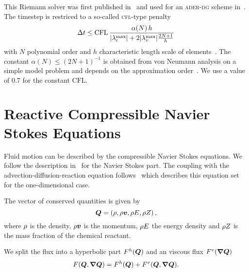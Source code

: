 This Riemann solver was first published in~\cite{gassner2008discontinuous} and used for an \textsc{ader-dg} scheme in~\cite{dumbser2010arbitrary}.
The timestep is restriced to a so-called \textsc{cfl}-type penalty
\begin{equation}
 \Delta t \leq  \text{CFL} \, \frac{\alpha(N) \, h}{\maxConvEigen + 2 \maxViscEigen \frac{2N+1}{h}}
\end{equation}
with $N$ polynomial order and $h$ characteristic length scale of elements~\cite{dumbser2010arbitrary,gassner2008discontinuous}.
The constant $\alpha(N) \leq {\left( 2N+1  \right)}^{-1}$ is obtained from von Neumann analysis on a simple model problem and depends on the approximation order~\cite{dumbser2008unified}.
We use a value of $0.7$ for the constant $\text{CFL}$.


\section{Reactive Compressible Navier Stokes Equations}
Fluid motion can be described by the compressible Navier Stokes equations.
We follow the description in~\cite{dumbser2010arbitrary} for the Navier Stokes part.
The coupling with the advection-diffusion-reaction equation follows~\cite{hidalgo2011ader} which describes this equation set for the one-dimensional case.

The vector of conserved quantities is given by
\begin{equation}
  \label{eq:conserved-variables}
 \bm{Q} = \left( \rho, \rho \bm{v}, \rho E, \rho Z \right),
\end{equation}
where $\rho$ is the density, $\rho \bm{v}$ is the momentum, $\rho E$ the energy density and $\rho Z$ is the mass fraction of the chemical reactant.

We split the flux into a hyperbolic part $F^{h}(\bm{Q})$ and an viscous flux $\viscFlux(\gradQ)$
\begin{equation}
  \label{eq:flux}
  \flux(\Q, \gradQ) = \hyperFlux(\Q) + \viscFlux(\Q, \gradQ).
\end{equation}

\newcommand{\diffCoeff}{\varepsilon}
\newcommand{\hyperFluxDef}{
  \begin{pmatrix}
    \Qj \\
    \Qv  \otimes \Qj + \bm{I} \pressure  \\
    \Qv \cdot (\bm{I} \QE + \bm{I} \pressure) \\
    \Qj \QZZ
  \end{pmatrix}
}

